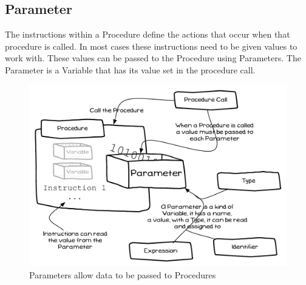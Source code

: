 \clearpage
\subsection{Parameter} %
\label{sub:parameter}

The instructions within a Procedure define the actions that occur when that procedure is called. In most cases these instructions need to be given values to work with. These values can be passed to the Procedure using Parameters. The Parameter is a Variable that has its value set in the procedure call.

\begin{figure}[h]
   \centering
   \includegraphics[width=\textwidth]{./topics/storing-using-data/diagrams/Parameter} 
   \caption{Parameters allow data to be passed to Procedures}
   \label{fig:parameters-parameters}
\end{figure}


